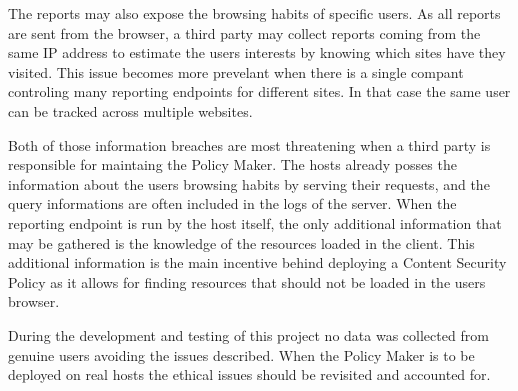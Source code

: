 The reports may also expose the browsing habits of specific users. 
As all reports are sent from the browser, a third party may collect reports coming from the same IP address to estimate the users interests by knowing which sites have they visited. 
This issue becomes more prevelant when there is a single compant controling many reporting endpoints for different sites.
In that case the same user can be tracked across multiple websites.

Both of those information breaches are most threatening when a third party is responsible for maintaing the Policy Maker.
The hosts already posses the information about the users browsing habits by serving their requests, and the query informations are often included in the logs of the server.
When the reporting endpoint is run by the host itself, the only additional information that may be gathered is the knowledge of the resources loaded in the client. 
This additional information is the main incentive behind deploying a Content Security Policy as it allows for finding resources that should not be loaded in the users browser.

During the development and testing of this project no data was collected from genuine users avoiding the issues described.
When the Policy Maker is to be deployed on real hosts the ethical issues should be revisited and accounted for.


